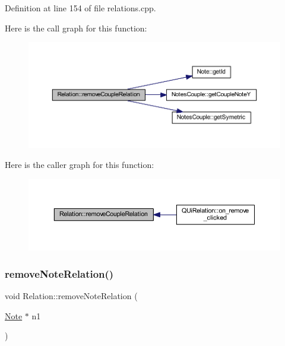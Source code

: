 Definition at line 154 of file relations.\+cpp.

Here is the call graph for this function\+:\nopagebreak
\begin{figure}[H]
\begin{center}
\leavevmode
\includegraphics[width=350pt]{class_relation_ab81e16d688dcb4703e8ab299fef80c10_cgraph}
\end{center}
\end{figure}
Here is the caller graph for this function\+:\nopagebreak
\begin{figure}[H]
\begin{center}
\leavevmode
\includegraphics[width=350pt]{class_relation_ab81e16d688dcb4703e8ab299fef80c10_icgraph}
\end{center}
\end{figure}
\mbox{\label{class_relation_a8f25fe0ab5bf722eb08d2dd31e99c7f4}} 
\subsubsection{\texorpdfstring{remove\+Note\+Relation()}{removeNoteRelation()}}
{\footnotesize\ttfamily void Relation\+::remove\+Note\+Relation (\begin{DoxyParamCaption}\item[{\hyperlink{class_note}{Note} $\ast$}]{n1 }\end{DoxyParamCaption})}



